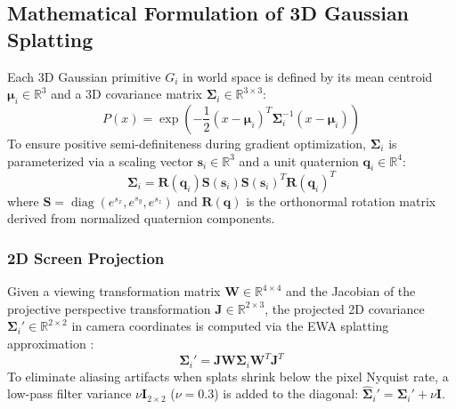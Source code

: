 \documentclass[conference]{IEEEtran}
\begin{document}
\subsection{Mathematical Formulation of 3D Gaussian Splatting}
Each 3D Gaussian primitive $G_i$ in world space is defined by its mean centroid $\boldsymbol{\mu}_i \in \mathbb{R}^3$ and a 3D covariance matrix $\boldsymbol{\Sigma}_i \in \mathbb{R}^{3 \times 3}$:
\begin{equation}
P(x) = \exp\left( -\frac{1}{2} (x - \boldsymbol{\mu}_i)^T \boldsymbol{\Sigma}_i^{-1} (x - \boldsymbol{\mu}_i) \right)
\end{equation}
To ensure positive semi-definiteness during gradient optimization, $\boldsymbol{\Sigma}_i$ is parameterized via a scaling vector $\mathbf{s}_i \in \mathbb{R}^3$ and a unit quaternion $\mathbf{q}_i \in \mathbb{R}^4$:
\begin{equation}
\boldsymbol{\Sigma}_i = \mathbf{R}(\mathbf{q}_i) \mathbf{S}(\mathbf{s}_i) \mathbf{S}(\mathbf{s}_i)^T \mathbf{R}(\mathbf{q}_i)^T
\end{equation}
where $\mathbf{S} = \operatorname{diag}(e^{s_{x}}, e^{s_{y}}, e^{s_{z}})$ and $\mathbf{R}(\mathbf{q})$ is the orthonormal rotation matrix derived from normalized quaternion components.

\subsubsection{2D Screen Projection}
Given a viewing transformation matrix $\mathbf{W} \in \mathbb{R}^{4 \times 4}$ and the Jacobian of the projective perspective transformation $\mathbf{J} \in \mathbb{R}^{2 \times 3}$, the projected 2D covariance $\boldsymbol{\Sigma}_i' \in \mathbb{R}^{2 \times 2}$ in camera coordinates is computed via the EWA splatting approximation \cite{zwicker2001ewa}:
\begin{equation}
\boldsymbol{\Sigma}_i' = \mathbf{J} \mathbf{W} \boldsymbol{\Sigma}_i \mathbf{W}^T \mathbf{J}^T
\end{equation}
To eliminate aliasing artifacts when splats shrink below the pixel Nyquist rate, a low-pass filter variance $\nu \mathbf{I}_{2 \times 2}$ ($\nu = 0.3$) is added to the diagonal: $\hat{\boldsymbol{\Sigma}}_i' = \boldsymbol{\Sigma}_i' + \nu \mathbf{I}$.
\end{document}

